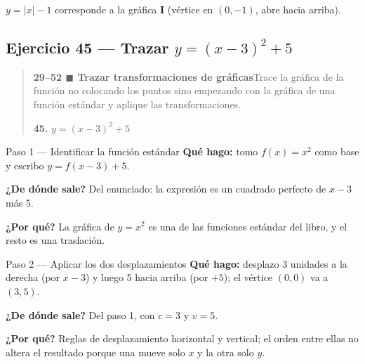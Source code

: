 \documentclass[11pt]{article}
\begin{document}
\begin{resp}
$y=|x|-1$ corresponde a la gráfica \textbf{I} (vértice en $(0,-1)$, abre hacia arriba).
\end{resp}

\subsection*{Ejercicio 45 — Trazar $y=(x-3)^2+5$}

\begin{quote}
\textbf{29--52 $\blacksquare$ Trazar transformaciones de gráficas}\quad Trace la gráfica de la función no colocando los puntos sino empezando con la gráfica de una función estándar y aplique las transformaciones.

\textbf{45.} $y=(x-3)^2+5$
\end{quote}

\begin{paso}{Paso 1 --- Identificar la función estándar}
\textbf{Qué hago:} tomo $f(x)=x^2$ como base y escribo $y=f(x-3)+5$.

\textbf{¿De dónde sale?} Del enunciado: la expresión es un cuadrado perfecto de $x-3$ más 5.

\textbf{¿Por qué?} La gráfica de $y=x^2$ es una de las funciones estándar del libro, y el resto es una traslación.
\end{paso}

\begin{paso}{Paso 2 --- Aplicar los dos desplazamientos}
\textbf{Qué hago:} desplazo 3 unidades a la derecha (por $x-3$) y luego 5 hacia arriba (por $+5$); el vértice $(0,0)$ va a $(3,5)$.

\textbf{¿De dónde sale?} Del paso 1, con $c=3$ y $v=5$.

\textbf{¿Por qué?} Reglas de desplazamiento horizontal y vertical; el orden entre ellas no altera el resultado porque una mueve solo $x$ y la otra solo $y$.

\begin{center}
\end{center}
\end{paso}
\end{document}
